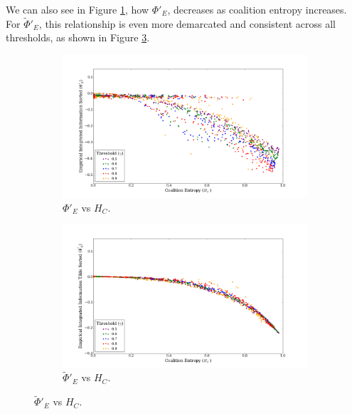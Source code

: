 \documentclass[a4paper,11pt]{article}
\begin{document}
We can also see in Figure \ref{fig:phi_sorted_vs_hc}, how $\Phi'_E$, decreases as coalition entropy increases. For $\widetilde{\Phi}'_E$, this relationship is even more demarcated and consistent across all thresholds, as shown in Figure \ref{fig:phi_tilde_sorted_vs_hc}.

\begin{figure}[H] 
	\label{fig:phi-vs-hc-sorted} 
	\begin{minipage}[b]{0.5\linewidth}
		\begin{figure}[H]
		\begin{center}
		\includegraphics[scale = 0.2]{figures/phi_sorted_vs_hc}
		\caption{
			$\Phi'_E$ vs $H_C$.
			\label{fig:phi_sorted_vs_hc}
		}
		\end{center}
		\end{figure}
		\vspace{2ex}
	\end{minipage}
	\begin{minipage}[b]{0.5\linewidth}
		\begin{figure}[H]
		\begin{center}
		\includegraphics[scale = 0.2]{figures/phi_tilde_sorted_vs_hc}
		\caption{
			$\widetilde{\Phi}'_E$ vs $H_C$.
			\label{fig:phi_tilde_sorted_vs_hc}
		}
		\end{center}
		\end{figure}
		\vspace{2ex}
	\end{minipage}
\end{figure}
\end{document}
